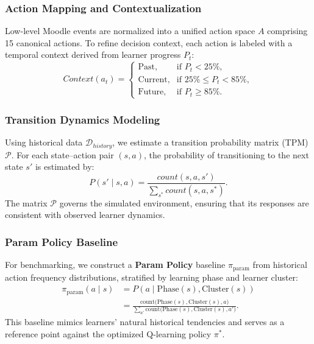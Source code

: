 \documentclass[9pt, conference, a4paper, compsocconf]{IEEEtran}
\begin{document}
\subsubsection{Action Mapping and Contextualization}
Low-level Moodle events are normalized into a unified action space $A$ comprising 15 canonical actions. To refine decision context, each action is labeled with a temporal context derived from learner progress $P_t$:
\begin{equation}
Context(a_t) =
\begin{cases} 
\text{Past}, & \text{if } P_t < 25\%, \\
\text{Current}, & \text{if } 25\% \le P_t < 85\%, \\
\text{Future}, & \text{if } P_t \ge 85\%.
\end{cases}
\end{equation}

\subsubsection{Transition Dynamics Modeling}
Using historical data $\mathcal{D}_{history}$, we estimate a transition probability matrix (TPM) $\mathcal{P}$. For each state--action pair $(s, a)$, the probability of transitioning to the next state $s'$ is estimated by:
\begin{equation}
P(s' \mid s, a) = \frac{count(s, a, s')}{\sum_{s^*} count(s, a, s^*)}.
\end{equation}
The matrix $\mathcal{P}$ governs the simulated environment, ensuring that its responses are consistent with observed learner dynamics.

\subsubsection{Param Policy Baseline}
For benchmarking, we construct a \textbf{Param Policy} baseline $\pi_{\text{param}}$ from historical action frequency distributions, stratified by learning phase and learner cluster:
\begin{equation}
\begin{aligned}
\pi_{\text{param}}(a \mid s) &= P(a \mid \text{Phase}(s), \text{Cluster}(s)) \\
&= \frac{\text{count}\big(\text{Phase}(s), \text{Cluster}(s), a\big)}
        {\sum_{a'} \text{count}\big(\text{Phase}(s), \text{Cluster}(s), a'\big)}.
\end{aligned}
\end{equation}
This baseline mimics learners' natural historical tendencies and serves as a reference point against the optimized Q-learning policy $\pi^*$.
\end{document}
